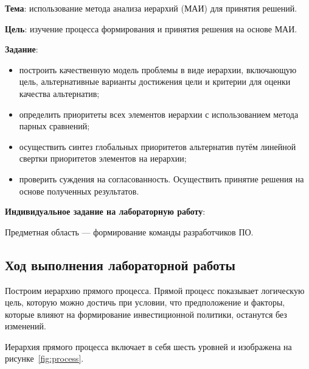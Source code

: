 


\newcommand{\labnumber}{3} %



\usepackage{systeme}
\usepackage{longtable,tabu}
\usepackage{multirow}
\usepackage{array,multirow}
\usepackage{pdflscape}
\usepackage{afterpage}
\usepackage{bm}

\graphicspath{{figures/}}


\Russian


\addtocounter{page}{1}

\textbf{Тема}: использование метода анализа иерархий (МАИ) для принятия решений.

\textbf{Цель}: изучение процесса формирования и принятия решения на основе МАИ.

\textbf{Задание}: 
\begin{itemize}
	\item построить качественную модель проблемы в виде иерархии, включающую цель, альтернативные варианты достижения цели и критерии для оценки качества альтернатив;
	\item определить приоритеты всех элементов иерархии с использованием метода парных сравнений;
	\item осуществить синтез глобальных приоритетов альтернатив путём линейной свертки приоритетов элементов на иерархии;
	\item проверить суждения на согласованность. Осуществить принятие решения на основе полученных результатов.
\end{itemize}

\textbf{Индивидуальное задание на лабораторную работу}:

Предметная область --- формирование команды разработчиков ПО. 

\subsection{Ход выполнения лабораторной работы}

Построим иерархию прямого процесса. Прямой процесс показывает логическую цель, которую можно достичь при условии, что предположение и факторы, которые влияют на формирование инвестиционной политики, останутся без изменений.

Иерархия прямого процесса включает в себя шесть уровней и изображена на рисунке~\ref{fig:process}.


